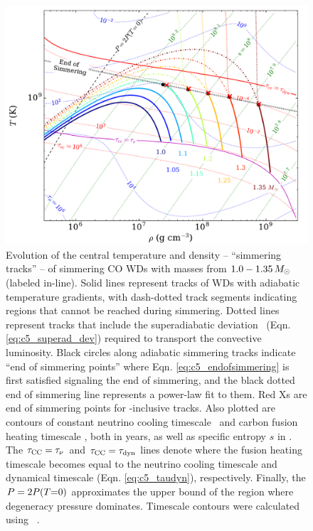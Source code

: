 \begin{figure}
\centering
\includegraphics[angle=0,width=1.0\columnwidth]{chapter5_zhu+16/figures/runaway_rhot.pdf}
\caption{Evolution of the central temperature and density -- ``simmering tracks'' -- of simmering CO WDs with masses from $1.0 - 1.35\,\Msun$ (labeled in-line).  Solid lines represent tracks of WDs with adiabatic temperature gradients, with dash-dotted track segments indicating regions that cannot be reached during simmering.  Dotted lines represent tracks that include the superadiabatic deviation \dnabconv\ (Eqn. \ref{eq:c5_superad_dev}) required to transport the convective luminosity.  Black circles along adiabatic simmering tracks indicate ``end of simmering points'' where Eqn. \ref{eq:c5_endofsimmering} is first satisfied signaling the end of simmering, and the black dotted end of simmering line represents a power-law fit to them.  Red Xs are end of simmering points for \dnabconv-inclusive tracks.  Also plotted are contours of constant neutrino cooling timescale \taunu\ and carbon fusion heating timescale \taucc, both in years, as well as specific entropy $s$ in \ergpKg.  The $\taucc = \taunu$ and $\taucc = \taudyn$ lines denote where the fusion heating timescale becomes equal to the neutrino cooling timescale and dynamical timescale (Eqn. \ref{eq:c5_taudyn}), respectively.  Finally, the $P = 2P(T\mathrm{=}0)$ approximates the upper bound of the region where degeneracy pressure dominates.  Timescale contours were calculated using \mesa\ \citep{paxt+11}.}
\label{fig:c5_runaway_rhot}
\end{figure}

